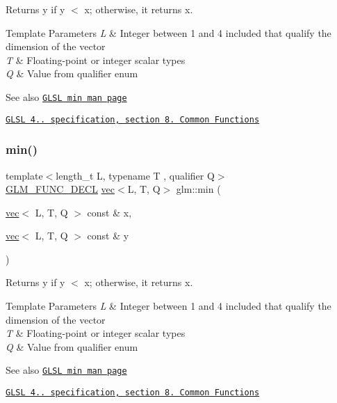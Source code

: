 Returns y if y $<$ x; otherwise, it returns x.


\begin{DoxyTemplParams}{Template Parameters}
{\em L} & Integer between 1 and 4 included that qualify the dimension of the vector \\
\hline
{\em T} & Floating-\/point or integer scalar types \\
\hline
{\em Q} & Value from qualifier enum\\
\hline
\end{DoxyTemplParams}
\begin{DoxySeeAlso}{See also}
\href{http://www.opengl.org/sdk/docs/manglsl/xhtml/min.xml}{\tt G\+L\+SL min man page} 

\href{http://www.opengl.org/registry/doc/GLSLangSpec.4.20.8.pdf}{\tt G\+L\+SL 4.. specification, section 8. Common Functions} 
\end{DoxySeeAlso}
\mbox{\label{group__core__func__common_ga734a374ca5c808e7bd9f74b6acfd7478}} 
\subsubsection{\texorpdfstring{min()}{min()}\hspace{0.1cm}{\footnotesize\ttfamily [3/3]}}
{\footnotesize\ttfamily template$<$length\+\_\+t L, typename T , qualifier Q$>$ \\
\hyperlink{setup_8hpp_ab2d052de21a70539923e9bcbf6e83a51}{G\+L\+M\+\_\+\+F\+U\+N\+C\+\_\+\+D\+E\+CL} \hyperlink{structglm_1_1vec}{vec}$<$L, T, Q$>$ glm\+::min (\begin{DoxyParamCaption}\item[{\hyperlink{structglm_1_1vec}{vec}$<$ L, T, Q $>$ const \&}]{x,  }\item[{\hyperlink{structglm_1_1vec}{vec}$<$ L, T, Q $>$ const \&}]{y }\end{DoxyParamCaption})}

Returns y if y $<$ x; otherwise, it returns x.


\begin{DoxyTemplParams}{Template Parameters}
{\em L} & Integer between 1 and 4 included that qualify the dimension of the vector \\
\hline
{\em T} & Floating-\/point or integer scalar types \\
\hline
{\em Q} & Value from qualifier enum\\
\hline
\end{DoxyTemplParams}
\begin{DoxySeeAlso}{See also}
\href{http://www.opengl.org/sdk/docs/manglsl/xhtml/min.xml}{\tt G\+L\+SL min man page} 

\href{http://www.opengl.org/registry/doc/GLSLangSpec.4.20.8.pdf}{\tt G\+L\+SL 4.. specification, section 8. Common Functions} 
\end{DoxySeeAlso}
\mbox{\label{group__core__func__common_ga8e93f374aae27d1a88b921860351f8d4}} 

